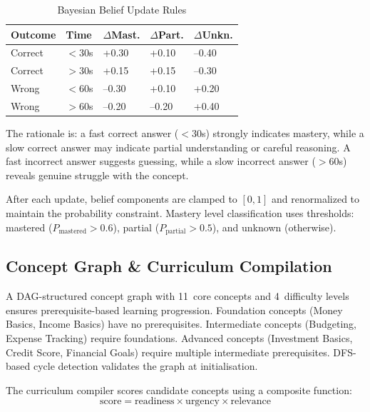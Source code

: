 \documentclass[conference]{IEEEtran}
\begin{document}
\begin{table}[!t]
\centering
\caption{Bayesian Belief Update Rules}
\label{tab:bkt}
\renewcommand{\arraystretch}{1.15}
\footnotesize
\begin{tabular}{p{1.5cm} p{1.2cm} p{1.1cm} p{1.1cm} p{1.3cm}}
\toprule
\textbf{Outcome} & \textbf{Time} & $\Delta$\textbf{Mast.} & $\Delta$\textbf{Part.} & $\Delta$\textbf{Unkn.} \\
\midrule
Correct & $<30$s & +0.30 & +0.10 & --0.40 \\
Correct & $>30$s & +0.15 & +0.15 & --0.30 \\
Wrong   & $<60$s & --0.30 & +0.10 & +0.20 \\
Wrong   & $>60$s & --0.20 & --0.20 & +0.40 \\
\bottomrule
\end{tabular}
\end{table}

The rationale is: a fast correct answer ($<30$s) strongly indicates mastery, while a slow correct answer may indicate partial understanding or careful reasoning. A fast incorrect answer suggests guessing, while a slow incorrect answer ($>60$s) reveals genuine struggle with the concept.

After each update, belief components are clamped to $[0, 1]$ and renormalized to maintain the probability constraint. Mastery level classification uses thresholds: mastered ($P_{\text{mastered}} > 0.6$), partial ($P_{\text{partial}} > 0.5$), and unknown (otherwise).

\subsection{Concept Graph \& Curriculum Compilation}

A DAG-structured concept graph with 11~core concepts and 4~difficulty levels ensures prerequisite-based learning progression. Foundation concepts (Money Basics, Income Basics) have no prerequisites. Intermediate concepts (Budgeting, Expense Tracking) require foundations. Advanced concepts (Investment Basics, Credit Score, Financial Goals) require multiple intermediate prerequisites. DFS-based cycle detection validates the graph at initialisation.

The curriculum compiler scores candidate concepts using a composite function:
\begin{equation}
\text{score} = \text{readiness} \times \text{urgency} \times \text{relevance}
\end{equation}
\end{document}
